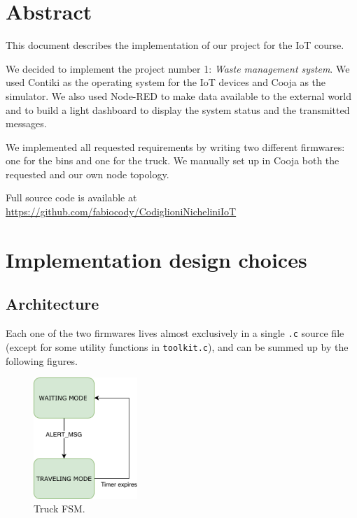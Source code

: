 \documentclass[a4paper, 11pt, parskip=half]{scrartcl}
\begin{document}
\begin{titlepage}
\vfill %

\end{titlepage}

\tableofcontents          %
\newpage


\section{Abstract}
This document describes the implementation of our project for the IoT course.

We decided to implement the project number 1: \textit{Waste management system}. We used Contiki as the operating system for the IoT devices and Cooja as the simulator. We also used Node-RED to make data available to the external world and to build a light dashboard to display the system status and the transmitted messages.

We implemented all requested requirements by writing two different firmwares: one for the bins and one for the truck. We manually set up in Cooja both the requested and our own node topology.

Full source code is available at \\
\url{https://github.com/fabiocody/CodiglioniNicheliniIoT}

\section{Implementation design choices}

\subsection{Architecture}

Each one of the two firmwares lives almost exclusively in a single \texttt{.c} source file (except for some utility functions in \texttt{toolkit.c}), and can be summed up by the following figures.

\begin{figure}[H]
	\centering
	\includegraphics[width=0.35\textwidth]{resources/truck_state_chart}
	\caption{Truck FSM.}
	\label{fig:truck-fsm}
\end{figure}
\end{document}
